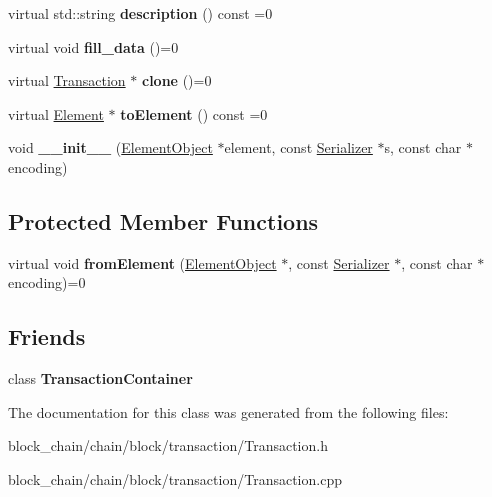 \begin{DoxyCompactItemize}
virtual std\+::string {\bfseries description} () const =0
\item 
\mbox{\label{classTransaction_a73b16e3d7e4c24e5b4da203740691e65}} 
virtual void {\bfseries fill\+\_\+data} ()=0
\item 
\mbox{\label{classTransaction_ad6ee9c5e4067b2f5c950c6aad131b3e4}} 
virtual \mbox{\hyperlink{classTransaction}{Transaction}} $\ast$ {\bfseries clone} ()=0
\item 
\mbox{\label{classComponent_a3e63d8c993e417a4af3f56d65ebfc7ea}} 
virtual \mbox{\hyperlink{classElement}{Element}} $\ast$ {\bfseries to\+Element} () const =0
\item 
\mbox{\label{classComponent_a28212595f8ee85fe009bd233bc99b2fc}} 
void {\bfseries \+\_\+\+\_\+init\+\_\+\+\_\+} (\mbox{\hyperlink{classElementObject}{Element\+Object}} $\ast$element, const \mbox{\hyperlink{classSerializer}{Serializer}} $\ast$s, const char $\ast$encoding)
\end{DoxyCompactItemize}
\subsection*{Protected Member Functions}
\begin{DoxyCompactItemize}
\item 
\mbox{\label{classComponent_a2ded18881226d0077dc393e0e9304bb1}} 
virtual void {\bfseries from\+Element} (\mbox{\hyperlink{classElementObject}{Element\+Object}} $\ast$, const \mbox{\hyperlink{classSerializer}{Serializer}} $\ast$, const char $\ast$encoding)=0
\end{DoxyCompactItemize}
\subsection*{Friends}
\begin{DoxyCompactItemize}
\item 
\mbox{\label{classTransaction_a923750871b34e0259e25cd3190b28c89}} 
class {\bfseries Transaction\+Container}
\end{DoxyCompactItemize}


The documentation for this class was generated from the following files\+:\begin{DoxyCompactItemize}
\item 
block\+\_\+chain/chain/block/transaction/Transaction.\+h\item 
block\+\_\+chain/chain/block/transaction/Transaction.\+cpp\end{DoxyCompactItemize}
